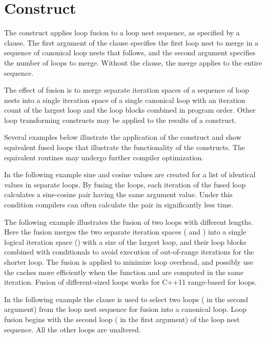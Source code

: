 \section{ Construct}
\label{sec:fuse}

The  construct applies loop fusion to a loop nest sequence, as
specified by a  clause. 
The first argument of the  clause specifies the first 
loop nest to merge in a sequence of canonical loop nests that follows,
and the second argument specifies the number of loops to merge.
Without the  clause, the merge applies to the entire sequence.

The effect of fusion is to merge 
separate iteration spaces of a sequence of loop nests
into a single iteration space of a single canonical loop
with an iteration count of the largest loop and the loop blocks
combined in program order. Other loop transforming constructs
may be applied to the results of a  construct.

Several examples below illustrate the application of the  construct
and show equivalent fused loops that illustrate the functionality of the constructs.
The equivalent routines may undergo further compiler optimization.


In the following example sine and cosine values are created for
a list of identical values in separate loops.
By fusing the loops, each iteration of the fused loop calculates
a sine-cosine pair having the same argument value.
Under this condition compilers can often calculate the pair
in significantly less time.



The following example illustrates the fusion of two loops with different lengths.
Here the fusion merges the two
separate iteration spaces ( and ) into a single 
logical iteration space ()
with a size of the largest loop, and their loop blocks
combined with conditionals to avoid 
execution of out-of-range iterations for the shorter loop.
The fusion is applied to minimize loop overhead, and possibly use
the caches more efficiently when the function  and  
are computed in the same iteration.
Fusion of different-sized loops works for C++11 range-based for loops.


In the following example the  clause is used to select two loops
( in the second argument)
from the loop nest sequence for fusion into a canonical loop. 
Loop fusion begins with the second loop ( in the first argument)
of the loop nest sequence. All the other loops are unaltered.



